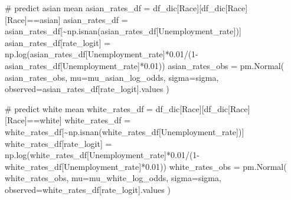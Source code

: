 \documentclass[
]{agujournal2019}
\newenvironment{Shaded}{\begin{snugshade}}{\end{snugshade}}
\newcommand{\CommentTok}[1]{\textcolor[rgb]{0.37,0.37,0.37}{#1}}
\newcommand{\DecValTok}[1]{\textcolor[rgb]{0.68,0.00,0.00}{#1}}
\newcommand{\FloatTok}[1]{\textcolor[rgb]{0.68,0.00,0.00}{#1}}
\newcommand{\NormalTok}[1]{\textcolor[rgb]{0.00,0.23,0.31}{#1}}
\newcommand{\OperatorTok}[1]{\textcolor[rgb]{0.37,0.37,0.37}{#1}}
\newcommand{\StringTok}[1]{\textcolor[rgb]{0.13,0.47,0.30}{#1}}
\begin{document}
\begin{Shaded}
\begin{Highlighting}[]
    \CommentTok{\# predict asian mean}
\NormalTok{    asian\_rates\_df }\OperatorTok{=}\NormalTok{ df\_dic[}\StringTok{\textquotesingle{}Race\textquotesingle{}}\NormalTok{][df\_dic[}\StringTok{\textquotesingle{}Race\textquotesingle{}}\NormalTok{][}\StringTok{\textquotesingle{}Race\textquotesingle{}}\NormalTok{]}\OperatorTok{==}\StringTok{\textquotesingle{}asian\textquotesingle{}}\NormalTok{]}
\NormalTok{    asian\_rates\_df }\OperatorTok{=}\NormalTok{ asian\_rates\_df[}\OperatorTok{\textasciitilde{}}\NormalTok{np.isnan(asian\_rates\_df[}\StringTok{\textquotesingle{}Unemployment\_rate\textquotesingle{}}\NormalTok{])] }
\NormalTok{    asian\_rates\_df[}\StringTok{\textquotesingle{}rate\_logit\textquotesingle{}}\NormalTok{] }\OperatorTok{=}\NormalTok{ np.log(asian\_rates\_df[}\StringTok{\textquotesingle{}Unemployment\_rate\textquotesingle{}}\NormalTok{]}\OperatorTok{*}\FloatTok{0.01}\OperatorTok{/}\NormalTok{(}\DecValTok{1}\OperatorTok{{-}}\NormalTok{asian\_rates\_df[}\StringTok{\textquotesingle{}Unemployment\_rate\textquotesingle{}}\NormalTok{]}\OperatorTok{*}\FloatTok{0.01}\NormalTok{))}
\NormalTok{    asian\_rates\_obs }\OperatorTok{=}\NormalTok{ pm.Normal(}
        \StringTok{\textquotesingle{}asian\_rates\_obs\textquotesingle{}}\NormalTok{,}
\NormalTok{        mu}\OperatorTok{=}\NormalTok{mu\_asian\_log\_odds,}
\NormalTok{        sigma}\OperatorTok{=}\NormalTok{sigma,}
\NormalTok{        observed}\OperatorTok{=}\NormalTok{asian\_rates\_df[}\StringTok{\textquotesingle{}rate\_logit\textquotesingle{}}\NormalTok{].values}
\NormalTok{    )}

    \CommentTok{\# predict white mean}
\NormalTok{    white\_rates\_df }\OperatorTok{=}\NormalTok{ df\_dic[}\StringTok{\textquotesingle{}Race\textquotesingle{}}\NormalTok{][df\_dic[}\StringTok{\textquotesingle{}Race\textquotesingle{}}\NormalTok{][}\StringTok{\textquotesingle{}Race\textquotesingle{}}\NormalTok{]}\OperatorTok{==}\StringTok{\textquotesingle{}white\textquotesingle{}}\NormalTok{]}
\NormalTok{    white\_rates\_df }\OperatorTok{=}\NormalTok{ white\_rates\_df[}\OperatorTok{\textasciitilde{}}\NormalTok{np.isnan(white\_rates\_df[}\StringTok{\textquotesingle{}Unemployment\_rate\textquotesingle{}}\NormalTok{])] }
\NormalTok{    white\_rates\_df[}\StringTok{\textquotesingle{}rate\_logit\textquotesingle{}}\NormalTok{] }\OperatorTok{=}\NormalTok{ np.log(white\_rates\_df[}\StringTok{\textquotesingle{}Unemployment\_rate\textquotesingle{}}\NormalTok{]}\OperatorTok{*}\FloatTok{0.01}\OperatorTok{/}\NormalTok{(}\DecValTok{1}\OperatorTok{{-}}\NormalTok{white\_rates\_df[}\StringTok{\textquotesingle{}Unemployment\_rate\textquotesingle{}}\NormalTok{]}\OperatorTok{*}\FloatTok{0.01}\NormalTok{))}
\NormalTok{    white\_rates\_obs }\OperatorTok{=}\NormalTok{ pm.Normal(}
        \StringTok{\textquotesingle{}white\_rates\_obs\textquotesingle{}}\NormalTok{,}
\NormalTok{        mu}\OperatorTok{=}\NormalTok{mu\_white\_log\_odds,}
\NormalTok{        sigma}\OperatorTok{=}\NormalTok{sigma,}
\NormalTok{        observed}\OperatorTok{=}\NormalTok{white\_rates\_df[}\StringTok{\textquotesingle{}rate\_logit\textquotesingle{}}\NormalTok{].values}
\NormalTok{    )}
    

\end{Highlighting}
\end{Shaded}
\end{document}
